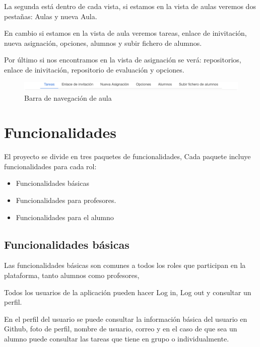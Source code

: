 La segunda está dentro de cada vista, si estamos en la vista de aulas veremos dos pestañas: Aulas y nueva Aula.

En cambio si estamos en la vista de aula veremos tareas, enlace de inivitación, nueva asignación, opciones, alumnos y subir fichero de alumnos.

Por último si nos encontramos en la vista de asignación se verá: repositorios, enlace de inivitación, repositorio de evaluación y opciones.

\begin{figure}[!th]
\begin{center}
\includegraphics[scale=0.5]{images/navaula}
\caption{Barra de navegación de aula}
\label{fig:Barra de navegacion de aula}
\end{center}
\end{figure}


\section{Funcionalidades}
\label{:sec6}

El proyecto se divide en tres paquetes de funcionalidades, Cada paquete incluye funcionalidades para cada rol:

\begin{itemize}
  \item Funcionalidades básicas
  \item Funcionalidades para profesores.
  \item Funcionalidades para el alumno
\end{itemize}

\subsection{Funcionalidades básicas}
\label{3:6:1}

Las funcionalidades básicas son comunes a todos los roles que participan en la plataforma, tanto alumnos como profesores, 

Todos los usuarios de la aplicación pueden hacer Log in, Log out y consultar un perfil.

En el perfil del usuario se puede consultar la información básica del usuario en Github, foto de perfil, nombre de usuario, correo y en el caso de que sea un alumno puede consultar las tareas que tiene en grupo o individualmente.

